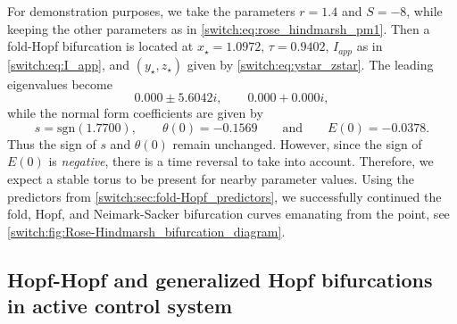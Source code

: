 For demonstration purposes, we take the parameters $r=1.4$ and $S=-8$, while keeping the other parameters as in \cref{switch:eq:rose_hindmarsh_pm1}. Then a fold-Hopf bifurcation is located at $x_{\star}=1.0972$, $\tau=0.9402$, $I_{app}$ as in \cref{switch:eq:I_app}, and $(y_\star,z_\star)$ given by \cref{switch:eq:ystar_zstar}. The leading eigenvalues become
\[
0.000\pm5.6042i, \qquad 0.000+0.000i,
\]
while the normal form coefficients are given by
\[
s=\mbox{sgn}(1.7700), \qquad \theta(0)=-0.1569 \qquad \mbox{and} \qquad E(0)=-0.0378.
\]
Thus the sign of $s$ and $\theta(0)$ remain unchanged. However, since the sign of $E(0)$ is  \emph{negative}, there is a time reversal to take into account. Therefore, we expect a stable torus to be present for nearby parameter values. Using the predictors from \cref{switch:sec:fold-Hopf_predictors}, we successfully continued the fold, Hopf, and Neimark-Sacker bifurcation curves emanating from the point, see \cref{switch:fig:Rose-Hindmarsh_bifurcation_diagram}. %

\subsection{Hopf-Hopf and generalized Hopf bifurcations in active control system}
\label{switch:sec:acs_example}

